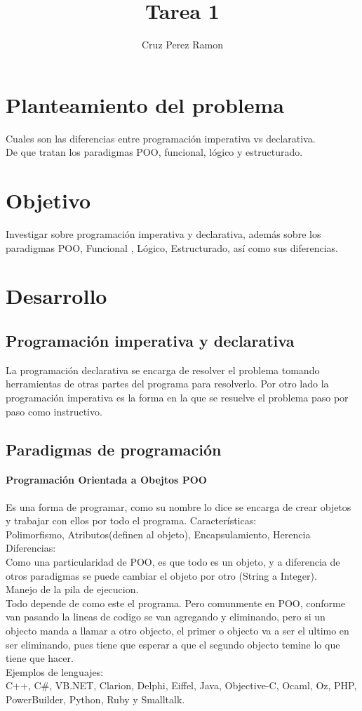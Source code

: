\documentclass[12pt]{article}
\title{Tarea 1}
\author{Cruz Perez Ramon}
\begin{document}
\maketitle

\section{Planteamiento del problema}
Cuales son las diferencias entre programación imperativa vs declarativa.\\
De que tratan los paradigmas POO, funcional, lógico y estructurado.

\section{Objetivo}
Investigar sobre programación imperativa y declarativa, además sobre los paradigmas POO, Funcional
, Lógico, Estructurado, así como sus diferencias.

\section{Desarrollo}
\subsection{Programación imperativa y declarativa}
La programación declarativa se encarga de resolver el problema tomando herramientas de otras partes del programa para resolverlo. Por otro lado la programación imperativa es la forma en la que se resuelve el problema paso por paso como instructivo.\\
\subsection{Paradigmas de programación}
\paragraph{Programación Orientada a Obejtos POO}
Es una forma de programar, como su nombre lo dice se encarga de crear objetos y trabajar con ellos por todo el programa. Características:\\
Polimorfismo, Atributos(definen al objeto), Encapsulamiento, Herencia\\
Diferencias:\\
Como una particularidad de POO, es que todo es un objeto, y a diferencia de otros paradigmas se puede cambiar el objeto por otro (String a Integer).\\
Manejo de la pila de ejecucion.\\
Todo depende de como este el programa. Pero comunmente en POO, conforme van pasando la lineas de codigo se van agregando y eliminando, pero si un objecto manda a llamar a otro objecto, el primer o objecto va a ser el ultimo en ser eliminando, pues tiene que esperar a que el segundo objecto temine lo que tiene que hacer.\\
Ejemplos de lenguajes:\\
 C++, C\#, VB.NET, Clarion, Delphi, Eiffel, Java, Objective-C, Ocaml, Oz, PHP, PowerBuilder, Python, Ruby y Smalltalk.
\end{document}
